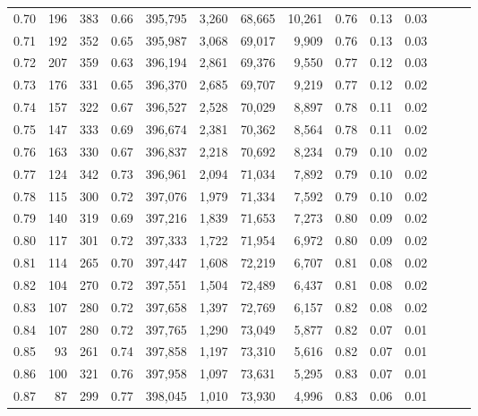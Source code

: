 \begin{tabular}{rrrrrrrrrrrrrr}
0.70 &     196 &    383 &  0.66 &  395,795 &    3,260 &  68,665 &  10,261 &  0.76 &  0.13 &      0.03 \\
0.71 &     192 &    352 &  0.65 &  395,987 &    3,068 &  69,017 &   9,909 &  0.76 &  0.13 &      0.03 \\
0.72 &     207 &    359 &  0.63 &  396,194 &    2,861 &  69,376 &   9,550 &  0.77 &  0.12 &      0.03 \\
0.73 &     176 &    331 &  0.65 &  396,370 &    2,685 &  69,707 &   9,219 &  0.77 &  0.12 &      0.02 \\
0.74 &     157 &    322 &  0.67 &  396,527 &    2,528 &  70,029 &   8,897 &  0.78 &  0.11 &      0.02 \\
0.75 &     147 &    333 &  0.69 &  396,674 &    2,381 &  70,362 &   8,564 &  0.78 &  0.11 &      0.02 \\
0.76 &     163 &    330 &  0.67 &  396,837 &    2,218 &  70,692 &   8,234 &  0.79 &  0.10 &      0.02 \\
0.77 &     124 &    342 &  0.73 &  396,961 &    2,094 &  71,034 &   7,892 &  0.79 &  0.10 &      0.02 \\
0.78 &     115 &    300 &  0.72 &  397,076 &    1,979 &  71,334 &   7,592 &  0.79 &  0.10 &      0.02 \\
0.79 &     140 &    319 &  0.69 &  397,216 &    1,839 &  71,653 &   7,273 &  0.80 &  0.09 &      0.02 \\
0.80 &     117 &    301 &  0.72 &  397,333 &    1,722 &  71,954 &   6,972 &  0.80 &  0.09 &      0.02 \\
0.81 &     114 &    265 &  0.70 &  397,447 &    1,608 &  72,219 &   6,707 &  0.81 &  0.08 &      0.02 \\
0.82 &     104 &    270 &  0.72 &  397,551 &    1,504 &  72,489 &   6,437 &  0.81 &  0.08 &      0.02 \\
0.83 &     107 &    280 &  0.72 &  397,658 &    1,397 &  72,769 &   6,157 &  0.82 &  0.08 &      0.02 \\
0.84 &     107 &    280 &  0.72 &  397,765 &    1,290 &  73,049 &   5,877 &  0.82 &  0.07 &      0.01 \\
0.85 &      93 &    261 &  0.74 &  397,858 &    1,197 &  73,310 &   5,616 &  0.82 &  0.07 &      0.01 \\
0.86 &     100 &    321 &  0.76 &  397,958 &    1,097 &  73,631 &   5,295 &  0.83 &  0.07 &      0.01 \\
0.87 &      87 &    299 &  0.77 &  398,045 &    1,010 &  73,930 &   4,996 &  0.83 &  0.06 &      0.01 \\

\end{tabular}
